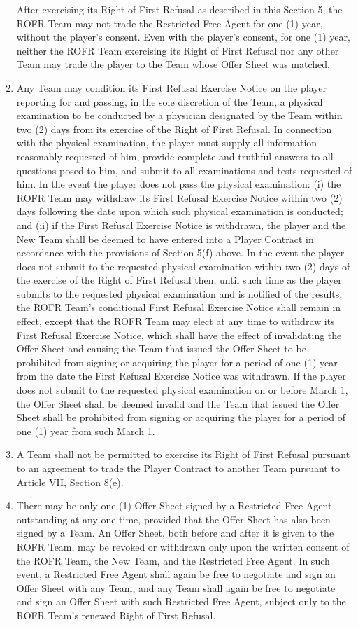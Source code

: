 \documentclass[
]{book}
\begin{document}
\begin{enumerate}
  After exercising its Right of First Refusal as described in this Section 5, the ROFR Team may not trade the Restricted Free Agent for one (1) year, without the player's consent. Even with the player's consent, for one (1) year, neither the ROFR Team exercising its Right of First Refusal nor any other Team may trade the player to the Team whose Offer Sheet was matched.
\item
  Any Team may condition its First Refusal Exercise Notice on the player reporting for and passing, in the sole discretion of the Team, a physical examination to be conducted by a physician designated by the Team within two (2) days from its exercise of the Right of First Refusal. In connection with the physical examination, the player must supply all information reasonably requested of him, provide complete and truthful answers to all questions posed to him, and submit to all examinations and tests requested of him. In the event the player does not pass the physical examination: (i) the ROFR Team may withdraw its First Refusal Exercise Notice within two (2) days following the date upon which such physical examination is conducted; and (ii) if the First Refusal Exercise Notice is withdrawn, the player and the New Team shall be deemed to have entered into a Player Contract in accordance with the provisions of Section 5(f) above. In the event the player does not submit to the requested physical examination within two (2) days of the exercise of the Right of First Refusal then, until such time as the player submits to the requested physical examination and is notified of the results, the ROFR Team's conditional First Refusal Exercise Notice shall remain in effect, except that the ROFR Team may elect at any time to withdraw its First Refusal Exercise Notice, which shall have the effect of invalidating the Offer Sheet and causing the Team that issued the Offer Sheet to be prohibited from signing or acquiring the player for a period of one (1) year from the date the First Refusal Exercise Notice was withdrawn. If the player does not submit to the requested physical examination on or before March 1, the Offer Sheet shall be deemed invalid and the Team that issued the Offer Sheet shall be prohibited from signing or acquiring the player for a period of one (1) year from such March 1.
\item
  A Team shall not be permitted to exercise its Right of First Refusal pursuant to an agreement to trade the Player Contract to another Team pursuant to Article VII, Section 8(e).
\item
  There may be only one (1) Offer Sheet signed by a Restricted Free Agent outstanding at any one time, provided that the Offer Sheet has also been signed by a Team. An Offer Sheet, both before and after it is given to the ROFR Team, may be revoked or withdrawn only upon the written consent of the ROFR Team, the New Team, and the Restricted Free Agent. In such event, a Restricted Free Agent shall again be free to negotiate and sign an Offer Sheet with any Team, and any Team shall again be free to negotiate and sign an Offer Sheet with such Restricted Free Agent, subject only to the ROFR Team's renewed Right of First Refusal.

\end{enumerate}
\end{document}
